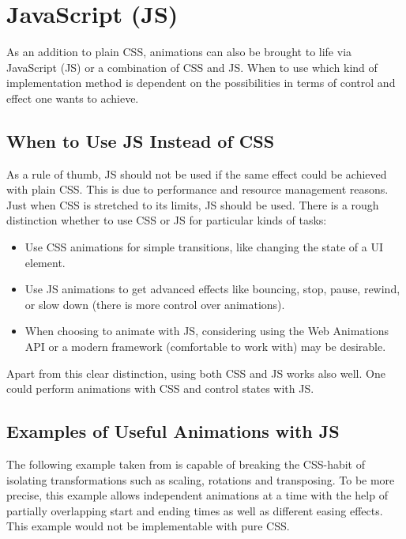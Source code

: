 %
%
% 
% 
% 


\chapter{JavaScript (JS)}

\label{chap:JS}

As an addition to plain CSS, animations can also be brought to life via JavaScript (JS) or a combination of CSS and JS. When to use which kind of implementation method is dependent on the possibilities in terms of control and effect one wants to achieve. 

\section{When to Use JS Instead of CSS}

As a rule of thumb, JS should not be used if the same effect could be achieved with plain CSS. This is due to performance and resource management reasons. Just when CSS is stretched to its limits, JS should be used. There is a rough distinction whether to use CSS or JS for particular kinds of tasks:
\begin{itemize}
	\item Use CSS animations for simple transitions, like changing the state of a UI element.
	\item Use JS animations to get advanced effects like bouncing, stop, pause, rewind, or slow down (there is more control over animations).
	\item When choosing to animate with JS, considering using the Web Animations API or a modern framework (comfortable to work with) may be desirable.
\end{itemize}
Apart from this clear distinction, using both CSS and JS works also well. One could perform animations with CSS and control states with JS.
\citep{googleDev}

\section{Examples of Useful Animations with JS}

The following example taken from \citet{transformsJS} is capable of breaking the CSS-habit of isolating transformations such as scaling, rotations and transposing. To be more precise, this example allows independent animations at a time with the help of partially overlapping start and ending times as well as different easing effects. This example would not be implementable with pure CSS.

